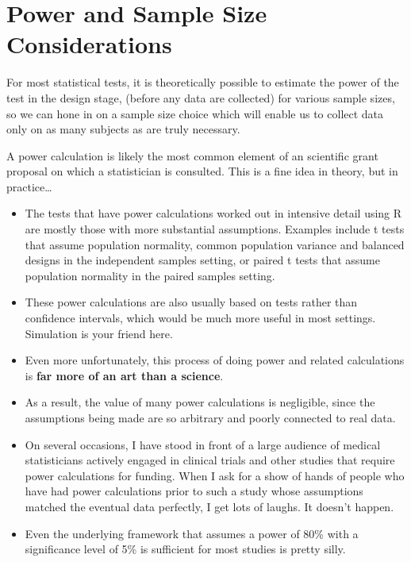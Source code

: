 \documentclass[
]{book}
\providecommand{\tightlist}{%
  \setlength{\itemsep}{0pt}\setlength{\parskip}{0pt}}
\begin{document}
\hypertarget{power-and-sample-size-considerations}{%
\section{Power and Sample Size Considerations}\label{power-and-sample-size-considerations}}

For most statistical tests, it is theoretically possible to estimate the power of the test in the design stage, (before any data are collected) for various sample sizes, so we can hone in on a sample size choice which will enable us to collect data only on as many subjects as are truly necessary.

A power calculation is likely the most common element of an scientific grant proposal on which a statistician is consulted. This is a fine idea in theory, but in practice\ldots{}

\begin{itemize}
\tightlist
\item
  The tests that have power calculations worked out in intensive detail using R are mostly those with more substantial assumptions. Examples include t tests that assume population normality, common population variance and balanced designs in the independent samples setting, or paired t tests that assume population normality in the paired samples setting.
\item
  These power calculations are also usually based on tests rather than confidence intervals, which would be much more useful in most settings. Simulation is your friend here.
\item
  Even more unfortunately, this process of doing power and related calculations is \textbf{far more of an art than a science}.
\item
  As a result, the value of many power calculations is negligible, since the assumptions being made are so arbitrary and poorly connected to real data.
\item
  On several occasions, I have stood in front of a large audience of medical statisticians actively engaged in clinical trials and other studies that require power calculations for funding. When I ask for a show of hands of people who have had power calculations prior to such a study whose assumptions matched the eventual data perfectly, I get lots of laughs. It doesn't happen.
\item
  Even the underlying framework that assumes a power of 80\% with a significance level of 5\% is sufficient for most studies is pretty silly.
\end{itemize}
\end{document}
